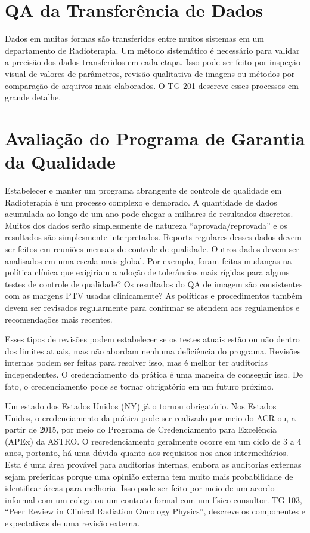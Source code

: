 \documentclass[11pt,a4paper]{article}
\newcounter{exemplo}
\begin{document}
\section{QA da Transferência de Dados}

	Dados em muitas formas são transferidos entre muitos sistemas em um departamento de Radioterapia. Um método sistemático é necessário para validar a precisão dos dados transferidos em cada etapa. Isso pode ser feito por inspeção visual de valores de parâmetros, revisão qualitativa de imagens ou métodos por comparação de arquivos mais elaborados. O TG-201 descreve esses processos em grande detalhe.

\section{Avaliação do Programa de Garantia da Qualidade}

	Estabelecer e manter um programa abrangente de controle de qualidade em Radioterapia é um processo complexo e demorado. A quantidade de dados acumulada ao longo de um ano pode chegar a milhares de resultados discretos. Muitos dos dados serão simplesmente de natureza ``aprovada/reprovada'' e os resultados são simplesmente interpretados. Reports regulares desses dados devem ser feitos em reuniões mensais de controle de qualidade. Outros dados devem ser analisados em uma escala mais global. Por exemplo, foram feitas mudanças na política clínica que exigiriam a adoção de tolerâncias mais rígidas para alguns testes de controle de qualidade? Os resultados do QA de imagem são consistentes com as margens PTV usadas clinicamente? As políticas e procedimentos também devem ser revisados regularmente para confirmar se atendem aos regulamentos e recomendações mais recentes.

	Esses tipos de revisões podem estabelecer se os testes atuais estão ou não dentro dos limites atuais, mas não abordam nenhuma deficiência do programa. Revisões internas podem ser feitas para resolver isso, mas é melhor ter auditorias independentes. O credenciamento da prática é uma maneira de conseguir isso. De fato, o credenciamento pode se tornar obrigatório em um futuro próximo. 

	Um estado dos Estados Unidos (NY) já o tornou obrigatório. Nos Estados Unidos, o credenciamento da prática pode ser realizado por meio do ACR ou, a partir de 2015, por meio do Programa de Credenciamento para Excelência (APEx) da ASTRO. O recredenciamento geralmente ocorre em um ciclo de 3 a 4 anos, portanto, há uma dúvida quanto aos requisitos nos anos intermediários. Esta é uma área provável para auditorias internas, embora as auditorias externas sejam preferidas porque uma opinião externa tem muito mais probabilidade de identificar áreas para melhoria. Isso pode ser feito por meio de um acordo informal com um colega ou um contrato formal com um físico consultor. TG-103, ``Peer Review in Clinical Radiation Oncology Physics'', descreve os componentes e expectativas de uma revisão externa.
\end{document}
